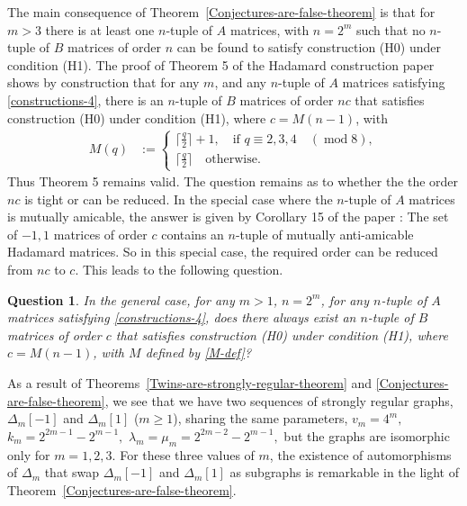\documentclass[12pt,a4paper]{article}
\newtheorem{Question}{Question}
\begin{document}
The main consequence of Theorem~\ref{Conjectures-are-false-theorem} is that for $m>3$ there is at least one $n$-tuple of $A$ matrices,
with $n=2^m$ such that no $n$-tuple of $B$ matrices of order $n$ can be found to satisfy construction (H0) under condition (H1).
The proof of Theorem 5 of the Hada\-mard construction paper \cite{Leo14Constructions} shows by construction that for any $m$,
and any $n$-tuple of $A$ matrices satisfying \eqref{constructions-4}, there is an $n$-tuple of $B$ matrices of order $nc$ that 
satisfies construction (H0) under condition (H1), where $c=M(n-1)$, with
\begin{align}
M(q) &:=
\begin{cases}
\lceil \frac{q}{2} \rceil + 1, \quad \text{if~} q \equiv 2,3,4 \quad (\operatorname{mod} 8),
\\
\lceil \frac{q}{2} \rceil \quad \text{otherwise.}
\end{cases}
\label{M-def}
\end{align}
Thus Theorem 5 remains valid.
The question remains as to whether the the order $nc$ is tight or can be reduced.
In the special case where the $n$-tuple of $A$ matrices is mutually amicable, the answer is given by Corollary 15 of the paper \cite{Leo14Constructions}:
The set of ${-1,1}$ matrices of order $c$ contains an $n$-tuple of mutually anti-amicable Hada\-mard matrices. 
So in this special case, the required order can be reduced from $nc$ to $c$.
This leads to the following question.
\begin{Question}
In the general case, for any $m>1$, $n=2^m$, for any $n$-tuple of $A$ matrices satisfying \eqref{constructions-4},
does there always exist an $n$-tuple of $B$ matrices of order $c$ that 
satisfies construction (H0) under condition (H1), where $c=M(n-1)$, with $M$ defined by \eqref{M-def}?
\end{Question}

As a result of Theorems~\ref{Twins-are-strongly-regular-theorem} and \ref{Conjectures-are-false-theorem},
we see that we have two sequences of strongly regular graphs, $\varDelta_m[-1]$ and $\varDelta_m[1]$ ($m \geqslant 1$),
sharing the same parameters, 
$v_m = 4^m,$ $k_m = 2^{2 m - 1} - 2^{m - 1},$ $\lambda_m=\mu_m=2^{2 m - 2} - 2^{m - 1},$
but the graphs are isomorphic only for $m=1, 2, 3$.
For these three values of $m$, the existence of
automorphisms of $\varDelta_m$ that swap $\varDelta_m[-1]$ and $\varDelta_m[1]$ 
as subgraphs \cite[Table 1]{Leo14Constructions}
is remarkable in the light of Theorem~\ref{Conjectures-are-false-theorem}.
\end{document}
